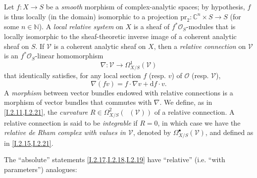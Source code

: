 \documentclass{report}
\theoremstyle{plain}
\theoremstyle{definition}
\newenvironment{env}[1]
    {\renewcommand\theinnercustomenv{#1}\innercustomenv}
    {\endinnercustomenv}
\newcommand{\sh}[1]{{\mathscr{#1}}}
\newcommand{\CC}{\mathbb{C}}
\newcommand{\NN}{\mathbb{N}}
\newcommand{\dd}{\mathrm{d}}
\newcommand{\pr}{\mathrm{pr}}
\DeclareMathOperator{\shEnd}{\underline{End}}
\begin{document}
\begin{env}{2.22}
\label{I.2.22}
  Let $f\colon X\to S$ be a \emph{smooth} morphism of complex-analytic spaces;
  by hypothesis, $f$ is thus locally (in the domain) isomorphic to a projection $\pr_2\colon\CC^n\times S\to S$ (for some $n\in\NN$).
  A \emph{local relative system} on $X$ is a sheaf of $f^*\sh{O}_S$-modules that is locally isomorphic to the sheaf-theoretic inverse image of a coherent analytic sheaf on $S$.
  If $\sh{V}$ is a coherent analytic sheaf on $X$, then a \emph{relative connection} on $\sh{V}$ is an $f^*\sh{O}_S$-linear homomorphism
  \[
    \nabla\colon \sh{V} \to \Omega_{X/S}^1(\sh{V})
  \]
  that identically satisfies, for any local section $f$ (resp. $v$) of $\sh{O}$ (resp. $\sh{V}$),
  \[
    \nabla(fv) = f\cdot\nabla v + \dd f\cdot v.
  \]
  A \emph{morphism} between vector bundles endowed with relative connections is a morphism of vector bundles that commutes with $\nabla$.
  We define, as in \cref{I.2.11,I.2.21}, the \emph{curvature} $R\in\Omega_{X/S}^2(\shEnd(\sh{V}))$ of a relative connection.
  A relative connection is said to be \emph{integrable} if $R=0$, in which case we have the \emph{relative de Rham complex with values in $\sh{V}$}, denoted by $\Omega_{X/S}^\bullet(\sh{V})$, and defined as in \cref{I.2.15,I.2.21}.
\end{env}

The ``absolute'' statements \cref{I.2.17,I.2.18,I.2.19} have ``relative'' (i.e. ``with parameters'') analogues:
\end{document}
